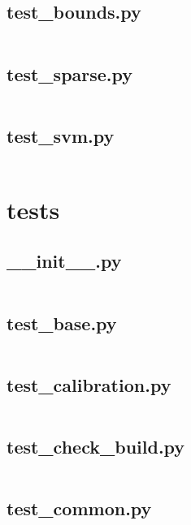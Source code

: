 \documentclass{article}
\begin{document}
\subsection{test\_bounds.py}
\inputminted{python}{/home/dufferzafar/dev/@clones/scikit-learn/sklearn/svm/tests/test_bounds.py}
\newpage

\subsection{test\_sparse.py}
\inputminted{python}{/home/dufferzafar/dev/@clones/scikit-learn/sklearn/svm/tests/test_sparse.py}
\newpage

\subsection{test\_svm.py}
\inputminted{python}{/home/dufferzafar/dev/@clones/scikit-learn/sklearn/svm/tests/test_svm.py}
\newpage

\section{tests}

\subsection{\_\_init\_\_.py}
\inputminted{python}{/home/dufferzafar/dev/@clones/scikit-learn/sklearn/tests/__init__.py}
\newpage

\subsection{test\_base.py}
\inputminted{python}{/home/dufferzafar/dev/@clones/scikit-learn/sklearn/tests/test_base.py}
\newpage

\subsection{test\_calibration.py}
\inputminted{python}{/home/dufferzafar/dev/@clones/scikit-learn/sklearn/tests/test_calibration.py}
\newpage

\subsection{test\_check\_build.py}
\inputminted{python}{/home/dufferzafar/dev/@clones/scikit-learn/sklearn/tests/test_check_build.py}
\newpage

\subsection{test\_common.py}
\inputminted{python}{/home/dufferzafar/dev/@clones/scikit-learn/sklearn/tests/test_common.py}
\newpage
\end{document}
